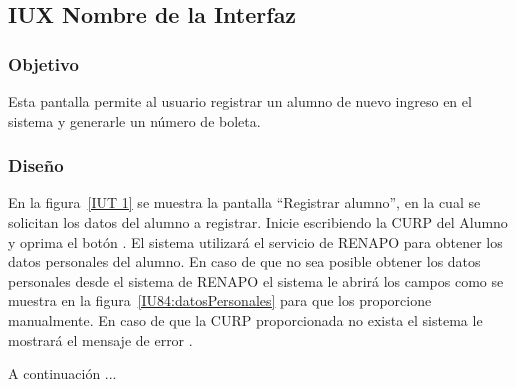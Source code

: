 \subsection{IUX Nombre de la Interfaz}

\subsubsection{Objetivo}

	
    Esta pantalla permite al usuario  registrar un alumno de nuevo ingreso en el sistema y generarle un número de boleta.

\subsubsection{Diseño}


    En la figura~\ref{IUT 1} se muestra la pantalla ``Registrar alumno'', en la cual se solicitan los datos del alumno a registrar. Inicie escribiendo la CURP del Alumno y oprima el botón . El sistema utilizará el servicio de RENAPO para obtener los datos personales del alumno. En caso de que no sea posible obtener los datos personales desde el sistema de RENAPO el sistema le abrirá los campos como se muestra en la figura~\ref{IU84:datosPersonales} para que los proporcione manualmente. En caso de que la CURP proporcionada no exista el sistema le mostrará el mensaje de error .
    
    A continuación ...



